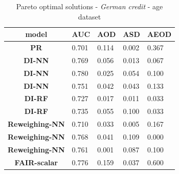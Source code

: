 \documentclass[preprint,12pt]{elsarticle}
\begin{document}
\begin{table}
	\centering
	\caption{Pareto optimal solutions - \textit{German credit} - age dataset}
	\begin{tabular}{|c|l|l|l|l|}
		\hline
		\textbf{model}          & \multicolumn{1}{c|}{\textbf{AUC}} & \multicolumn{1}{c|}{\textbf{AOD}} & \multicolumn{1}{c|}{\textbf{ASD}} & \multicolumn{1}{c|}{\textbf{AEOD}} \\ \hline
		\textbf{PR}             & 0.701                             & 0.114                             & 0.002                             & 0.367                              \\ \hline
		\textbf{DI-NN}          & 0.769                             & 0.056                             & 0.013                             & 0.067                              \\ \hline
		\textbf{DI-NN}          & 0.780                             & 0.025                             & 0.054                             & 0.100                              \\ \hline
		\textbf{DI-NN}          & 0.751                             & 0.042                             & 0.043                             & 0.133                              \\ \hline
		\textbf{DI-RF}          & 0.727                             & 0.017                             & 0.011                             & 0.033                              \\ \hline
		\textbf{DI-RF}          & 0.735                             & 0.055                             & 0.100                             & 0.033                              \\ \hline
		\textbf{Reweighing-NN}  & 0.710                             & 0.033                             & 0.005                             & 0.167                              \\ \hline
		\textbf{Reweighing-NN}  & 0.768                             & 0.041                             & 0.109                             & 0.000                              \\ \hline
		\textbf{Reweighing-NN}  & 0.761                             & 0.001                             & 0.087                             & 0.100                              \\ \hline
		\textbf{FAIR-scalar}    & 0.776                             & 0.159                             & 0.037                             & 0.600                              \\ \hline

\end{tabular}
\end{table}
\end{document}
